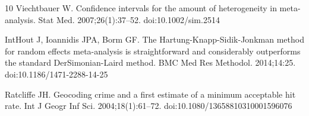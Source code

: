 \documentclass[11pt,letterpaper]{article}
\begin{document}
\begin{thebibliography}{10}
Viechtbauer W.
\newblock Confidence intervals for the amount of heterogeneity in meta-analysis.
\newblock Stat Med. 2007;26(1):37--52.
\newblock doi:10.1002/sim.2514

IntHout J, Ioannidis JPA, Borm GF.
\newblock The Hartung-Knapp-Sidik-Jonkman method for random effects meta-analysis is
straightforward and considerably outperforms the standard DerSimonian-Laird method.
\newblock BMC Med Res Methodol. 2014;14:25.
\newblock doi:10.1186/1471-2288-14-25

Ratcliffe JH.
\newblock Geocoding crime and a first estimate of a minimum acceptable hit rate.
\newblock Int J Geogr Inf Sci. 2004;18(1):61--72.
\newblock doi:10.1080/13658810310001596076

\end{thebibliography}
\end{document}
